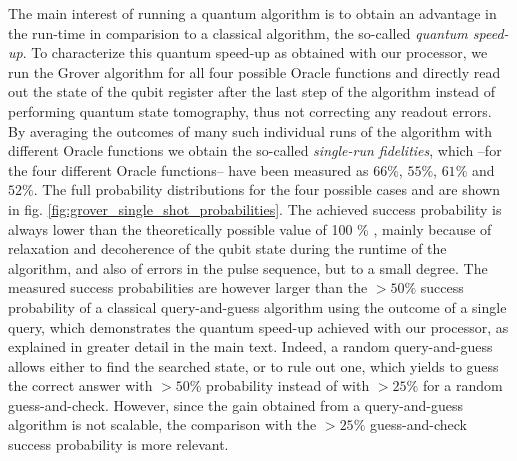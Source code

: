The main interest of running a quantum algorithm is to obtain an advantage in the run-time in comparision to a classical algorithm, the so-called {\it quantum speed-up}. To characterize this quantum speed-up as obtained with our processor, we run the Grover algorithm for all four possible Oracle functions and directly read out the state of the qubit register after the last step of the algorithm instead of performing quantum state tomography, thus not correcting any readout errors. By averaging the outcomes of many such individual runs of the algorithm with different Oracle functions we obtain the so-called {\it single-run fidelities}, which --for the four different Oracle functions-- have been measured as $66 \%$, $55\%$, $61\%$ and $52\%$. The full probability distributions for the four possible cases and are shown in fig. \ref{fig:grover_single_shot_probabilities}. The achieved success probability is  always lower than the theoretically possible value  of 100 \% ,  mainly because of relaxation and decoherence of the qubit state during the runtime of the algorithm, and also of errors in the pulse sequence, but to a small degree. The measured success probabilities are however larger than the $> 50 \%$ success probability of a classical query-and-guess algorithm using the outcome of a single query, which  demonstrates the   quantum speed-up achieved with our processor, as explained in greater detail in the main text. Indeed, a   random query-and-guess   allows either to find the searched state, or to rule out one, which  yields to guess  the correct answer with $> 50 \%$ probability instead of  with $> 25 \%$ for a random guess-and-check. However, since the gain obtained from a query-and-guess  algorithm is not scalable, the comparison with the $> 25 \%$ guess-and-check success probability is more relevant. 

